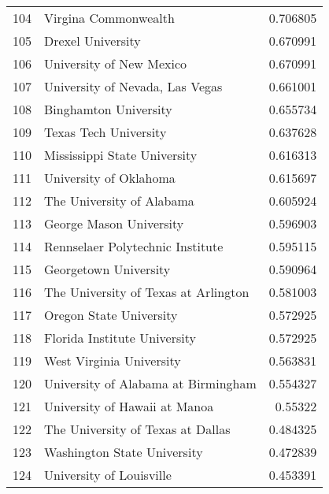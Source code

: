 \begin{tabular}{rlr}
 104 & Virgina Commonwealth                                           &  0.706805 \\
 105 & Drexel University                                              &  0.670991 \\
 106 & University of New Mexico                                       &  0.670991 \\
 107 & University of Nevada, Las Vegas                                &  0.661001 \\
 108 & Binghamton University                                          &  0.655734 \\
 109 & Texas Tech University                                          &  0.637628 \\
 110 & Mississippi State University                                   &  0.616313 \\
 111 & University of Oklahoma                                         &  0.615697 \\
 112 & The University of Alabama                                      &  0.605924 \\
 113 & George Mason University                                        &  0.596903 \\
 114 & Rennselaer Polytechnic Institute                               &  0.595115 \\
 115 & Georgetown University                                          &  0.590964 \\
 116 & The University of Texas at Arlington                           &  0.581003 \\
 117 & Oregon State University                                        &  0.572925 \\
 118 & Florida Institute University                                   &  0.572925 \\
 119 & West Virginia University                                       &  0.563831 \\
 120 & University of Alabama at Birmingham                            &  0.554327 \\
 121 & University of Hawaii at Manoa                                  &  0.55322  \\
 122 & The University of Texas at Dallas                              &  0.484325 \\
 123 & Washington State University                                    &  0.472839 \\
 124 & University of Louisville                                       &  0.453391 \\

\end{tabular}
